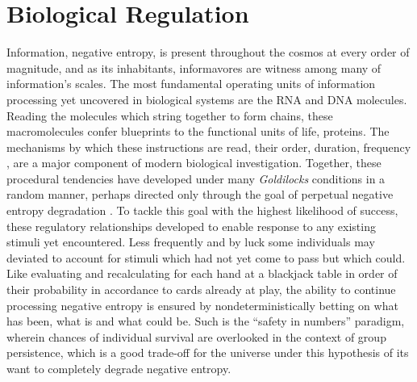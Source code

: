 % 
\section{Biological Regulation}
\label{sec:bioreg}
Information, \ie negative entropy, is present throughout the cosmos at every order of magnitude, and as its inhabitants, informavores are witness among many of information's scales. The most fundamental operating units of information processing yet uncovered in biological systems are the RNA and DNA molecules. Reading the molecules which string together to form chains, these macromolecules confer blueprints to the functional units of life, proteins. The mechanisms by which these instructions are read, \eg their order, duration, frequency \etc, are a major component of modern biological investigation. Together, these procedural tendencies have developed under many \emph{Goldilocks} conditions in a random manner, perhaps directed only through the goal of perpetual negative entropy degradation \citep{england2013statistical}. To tackle this goal with the highest likelihood of success, these regulatory relationships developed to enable response to any existing stimuli yet encountered. Less frequently and by luck some individuals may deviated to account for stimuli which had not yet come to pass but which could. Like evaluating and recalculating for each hand at a blackjack table in order of their probability in accordance to cards already at play, the ability to continue processing negative entropy is ensured by nondeterministically betting on what has been, what is and what could be. Such is the ``safety in numbers'' paradigm, wherein chances of individual survival are overlooked in the context of group persistence, which is a good trade-off for the universe under this hypothesis of its want to completely degrade negative entropy.

